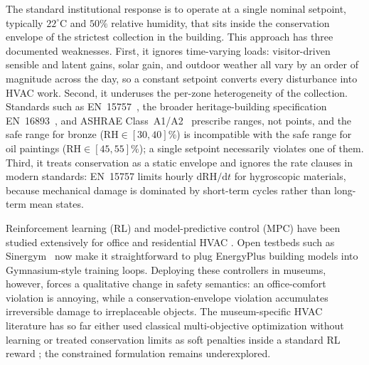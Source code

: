 \documentclass[11pt,a4paper]{article}
\begin{document}
The standard institutional response is to operate at a single nominal
setpoint, typically $22^\circ\mathrm{C}$ and $50\%$ relative humidity, that
sits inside the conservation envelope of the strictest collection in the
building. This approach has three documented weaknesses. First, it ignores
time-varying loads: visitor-driven sensible and latent gains, solar gain,
and outdoor weather all vary by an order of magnitude across the day, so
a constant setpoint converts every disturbance into HVAC work. Second, it
underuses the per-zone heterogeneity of the collection. Standards such as
EN~15757~\citep{en15757}, the broader heritage-building specification
EN~16893~\citep{en16893}, and ASHRAE Class~A1/A2~\citep{ashrae_handbook_ch24}
prescribe ranges, not points, and the safe range for bronze
($\mathrm{RH}\in[30,40]\%$) is incompatible with the safe range for oil
paintings ($\mathrm{RH}\in[45,55]\%$); a single setpoint necessarily
violates one of them. Third, it treats conservation as a static envelope
and ignores the rate clauses in modern standards: EN~15757 limits hourly
$\mathrm{d}\mathrm{RH}/\mathrm{d}t$ for hygroscopic materials, because
mechanical damage is dominated by short-term cycles rather than long-term
mean states.

Reinforcement learning (RL) and model-predictive control (MPC) have been
studied extensively for office and residential HVAC
\citep{brandi2022online,wang2017drlhvac,drgona2020mpc_review}. Open
testbeds such as Sinergym~\citep{manjavacas2024sinergym} now make it
straightforward to plug EnergyPlus building models into Gymnasium-style
training loops. Deploying these controllers in museums, however, forces a
qualitative change in safety semantics: an office-comfort violation is
annoying, while a conservation-envelope violation accumulates irreversible
damage to irreplaceable objects. The museum-specific HVAC literature has
so far either used classical multi-objective optimization without learning
\citep{ascione2018museum,schito2020museum} or treated conservation limits
as soft penalties inside a standard RL reward
\citep{green_smart_museums_2025,boesgaard2022heritage}; the constrained
formulation remains underexplored.
\end{document}

